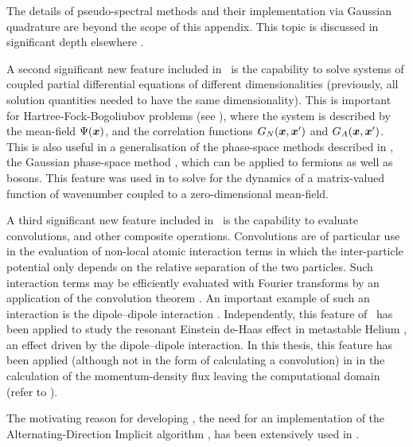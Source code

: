 The details of pseudo-spectral methods and their implementation via Gaussian quadrature are beyond the scope of this appendix.  This topic is discussed in significant depth elsewhere \citep{SpectralMethods}.

A second significant new feature included in \xpdeint\ is the capability to solve systems of coupled partial differential equations of different dimensionalities (previously, all solution quantities needed to have the same dimensionality).  This is important for Hartree-Fock-Bogoliubov problems (see ), where the system is described by the mean-field $\Psi(\bm{x})$, and the correlation functions $G_{N}(\bm{x}, \bm{x}')$ and $G_A(\bm{x}, \bm{x}')$.  This is also useful in a generalisation of the phase-space methods described in , the Gaussian phase-space method \citep{Drummond:2007,Drummond:2007a}, which can be applied to fermions as well as bosons.  This feature was used in  to solve for the dynamics of a matrix-valued function of wavenumber coupled to a zero-dimensional mean-field.

A third significant new feature included in \xpdeint\ is the capability to evaluate convolutions, and other composite operations.  Convolutions are of particular use in the evaluation of non-local atomic interaction terms in which the inter-particle potential only depends on the relative separation of the two particles.  Such interaction terms may be efficiently evaluated with Fourier transforms by an application of the convolution theorem \citep{ArfkenWeber}.  An important example of such an interaction is the dipole--dipole interaction \citep{Goral:2002}.  Independently, this feature of \xpdeint\ has been applied to study the resonant Einstein de-Haas effect \citep{Gawryluk:2007} in metastable Helium \citep{Stevenson:2008}, an effect driven by the dipole--dipole interaction.  In this thesis, this feature has been applied (although not in the form of calculating a convolution) in  in the calculation of the momentum-density flux leaving the computational domain (refer to ).

The motivating reason for developing \xpdeint, the need for an implementation of the Alternating-Direction Implicit algorithm \citep{NumericalRecipes}, has been extensively used in .

